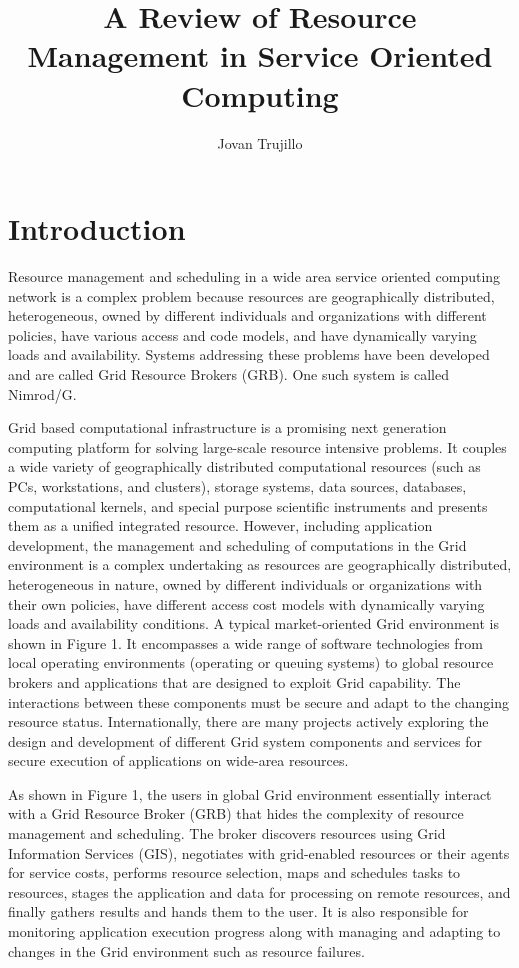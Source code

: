 \documentclass{article}
\title{A Review of Resource Management in Service Oriented Computing}
\author{Jovan Trujillo}
\date{\currenttime}
\begin{document}
\maketitle

\section{Introduction}
Resource management and scheduling in a wide area service oriented computing network is a complex problem because resources are geographically distributed, heterogeneous, owned by different individuals and organizations with different policies, have various access and code models, and have dynamically varying loads and availability.\citep{economygrid} Systems addressing these problems have been developed and are called Grid Resource Brokers (GRB). One such system is called Nimrod/G.

Grid based computational infrastructure is a promising next generation computing platform for solving large-scale resource intensive problems. It couples a wide variety of geographically distributed computational resources (such as PCs, workstations, and clusters), storage systems, data sources, databases, computational kernels, and special purpose scientific instruments and presents them as a unified integrated resource. However, including application development, the management and scheduling of computations in the Grid environment is a complex undertaking as resources are geographically distributed, heterogeneous in nature, owned by different individuals or organizations with their own policies, have different access cost models with dynamically varying loads and availability conditions. A typical market-oriented Grid environment is shown in Figure 1. It encompasses a wide range of software technologies from local operating environments (operating or queuing systems) to global resource brokers and applications that are designed to exploit Grid capability. The interactions between these components must be secure and adapt to the changing resource status. Internationally, there are many projects actively exploring the design and development of different Grid system components and services for secure execution of applications on wide-area resources.

As shown in Figure 1, the users in global Grid environment essentially interact with a Grid Resource Broker (GRB) that hides the complexity of resource management and scheduling. The broker discovers resources using Grid Information Services (GIS), negotiates with grid-enabled resources or their agents for service costs, performs resource selection, maps and schedules tasks to resources, stages the application and data for processing on remote resources, and finally gathers results and hands them to the user. It is also responsible for monitoring application execution progress along with managing and adapting to changes in the Grid environment such as resource failures. 
\end{document}
